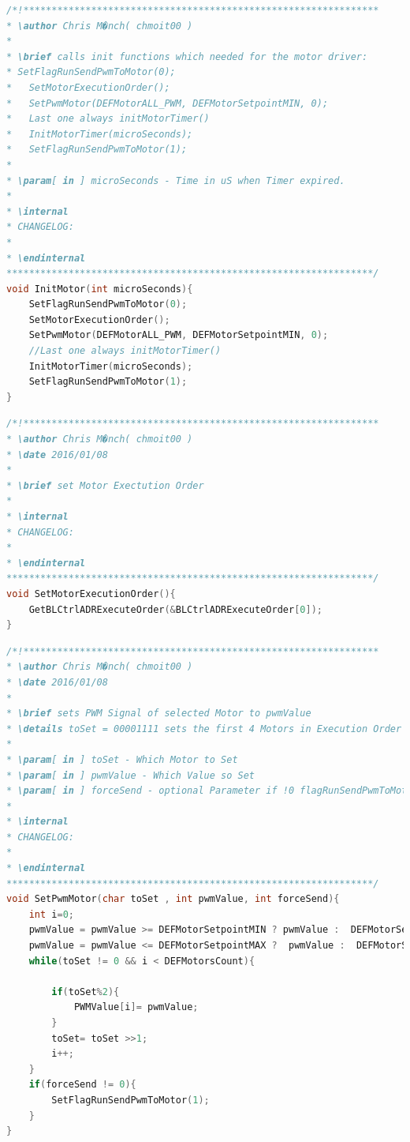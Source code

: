 \begin{lstlisting}[language=C++,firstnumber=21]
/*!***************************************************************
* \author Chris M�nch( chmoit00 )
*
* \brief calls init functions which needed for the motor driver:
* SetFlagRunSendPwmToMotor(0);
*	SetMotorExecutionOrder();
*	SetPwmMotor(DEFMotorALL_PWM, DEFMotorSetpointMIN, 0);
*	Last one always initMotorTimer()
*	InitMotorTimer(microSeconds);
*	SetFlagRunSendPwmToMotor(1);
*
* \param[ in ] microSeconds - Time in uS when Timer expired.
*
* \internal
* CHANGELOG:
*
* \endinternal
*****************************************************************/
void InitMotor(int microSeconds){
	SetFlagRunSendPwmToMotor(0);
	SetMotorExecutionOrder();
	SetPwmMotor(DEFMotorALL_PWM, DEFMotorSetpointMIN, 0);
	//Last one always initMotorTimer()
	InitMotorTimer(microSeconds);
	SetFlagRunSendPwmToMotor(1);
}
\end{lstlisting}

\begin{lstlisting}[language=C++,firstnumber=48]
/*!***************************************************************
* \author Chris M�nch( chmoit00 )
* \date 2016/01/08
*
* \brief set Motor Exectution Order
*
* \internal
* CHANGELOG:
*
* \endinternal
*****************************************************************/
void SetMotorExecutionOrder(){
	GetBLCtrlADRExecuteOrder(&BLCtrlADRExecuteOrder[0]);
}
\end{lstlisting}

\begin{lstlisting}[language=C++,firstnumber=63]
/*!***************************************************************
* \author Chris M�nch( chmoit00 )
* \date 2016/01/08
*
* \brief sets PWM Signal of selected Motor to pwmValue
* \details toSet = 00001111 sets the first 4 Motors in Execution Order to pwmValue
*
* \param[ in ] toSet - Which Motor to Set
* \param[ in ] pwmValue - Which Value so Set
* \param[ in ] forceSend - optional Parameter if !0 flagRunSendPwmToMotor will be set
*
* \internal
* CHANGELOG:
*
* \endinternal
*****************************************************************/
void SetPwmMotor(char toSet , int pwmValue, int forceSend){
	int i=0;
	pwmValue = pwmValue >= DEFMotorSetpointMIN ? pwmValue :  DEFMotorSetpointMIN;
	pwmValue = pwmValue <= DEFMotorSetpointMAX ?  pwmValue :  DEFMotorSetpointMAX;
	while(toSet != 0 && i < DEFMotorsCount){
	
		if(toSet%2){
			PWMValue[i]= pwmValue;
		}
		toSet= toSet >>1;
		i++;
	}
	if(forceSend != 0){
		SetFlagRunSendPwmToMotor(1);
	}
}
\end{lstlisting}

